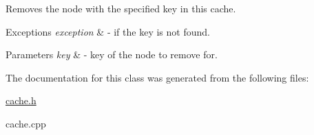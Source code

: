 Removes the node with the specified key in this cache. 


\begin{DoxyExceptions}{Exceptions}
{\em exception} & -\/ if the key is not found. \\
\hline
\end{DoxyExceptions}

\begin{DoxyParams}{Parameters}
{\em key} & -\/ key of the node to remove for. \\
\hline
\end{DoxyParams}


The documentation for this class was generated from the following files\+:\begin{DoxyCompactItemize}
\item 
\hyperlink{cache_8h}{cache.\+h}\item 
cache.\+cpp\end{DoxyCompactItemize}
